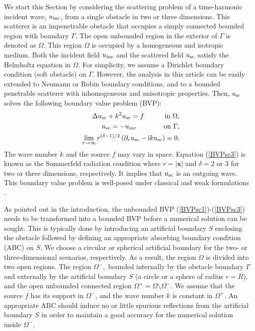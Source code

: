 \documentclass[final,3p,times,12pt]{elsarticle}
\newcommand{\clo}{\overline}
\newcommand{\usc}{u_{\rm sc}}
\newcommand{\uinc}{u_{\rm inc}}
\begin{document}
We start this Section by considering the scattering problem of a time-harmonic incident wave, $\uinc$, from a single obstacle in two or three dimensions. This scatterer is an impenetrable obstacle that occupies a simply connected bounded region  with boundary $\Gamma$. The open unbounded region in the exterior of $\Gamma$ is denoted as 
$\Omega$. This region $\Omega$ is occupied by a homogeneous and isotropic medium. Both the incident field $\uinc$ and the scattered field $\usc$ satisfy the Helmholtz equation in $\Omega$. For simplicity, we assume a Dirichlet boundary condition (soft obstacle)  on $\Gamma$. However,  the analysis in this article can be easily extended to Neumann or Robin boundary conditions, and to a bounded penetrable scatterer with inhomogeneous and anisotropic properties. Then, $\usc$ solves the following boundary value problem (BVP):
\begin{eqnarray}
&& \Delta \usc + k^2 \usc = f \quad\qquad \text{in $\Omega$}, \label{BVPsc1} \\
&& \usc = - \uinc \qquad\qquad \text{on $\Gamma$,} \label{BVPsc2} \\
&& \lim_{r \rightarrow \infty} r^{(\delta-1)/2} \left( \partial_{r} \usc- \mathrm{i} k \usc \right) = 0.\label{BVPsc3}
\end{eqnarray}
 {The wave number $k$ and the source $f$ may vary in space}. Equation (\ref{BVPsc3}) is known as the Sommerfeld radiation condition where $r = |\textbf{x}|$ and $\delta=2$ or 3 for two or three dimensions, respectively. It implies that $\usc$ is an outgoing wave. This boundary value problem is well-posed under classical and weak formulations \cite{ColtonKress02,Nedelec01,McLean2000}. 


As pointed out in the introduction, the unbounded BVP (\ref{BVPsc1})-(\ref{BVPsc3}) needs to be transformed into a bounded BVP before a numerical solution can be sought. 
This is typically done by introducing an artificial boundary $S$ enclosing the obstacle followed by defining an appropriate absorbing boundary condition (ABC) on $S$. We choose a circular or spherical artificial boundary for the two- or three-dimensional scenarios, respectively. As a result, the region $\Omega$ is divided into two open regions. The region 
$\Omega^{-},$ bounded internally by the obstacle boundary $\Gamma$ and externally by the artificial boundary $S$ (a circle or a sphere of radius $r=R$), and the open unbounded connected region $\Omega^{+}= \Omega \setminus \clo{\Omega^{-}}$.  {We assume that the source $f$ has its support in $\Omega^{-}$, and the wave number $k$ is constant in $\Omega^{+}$}. An appropriate ABC should induce no or little spurious reflections from the artificial boundary $S$ in order to maintain a good accuracy for the numerical solution inside $\Omega^{-}$.  
\end{document}
